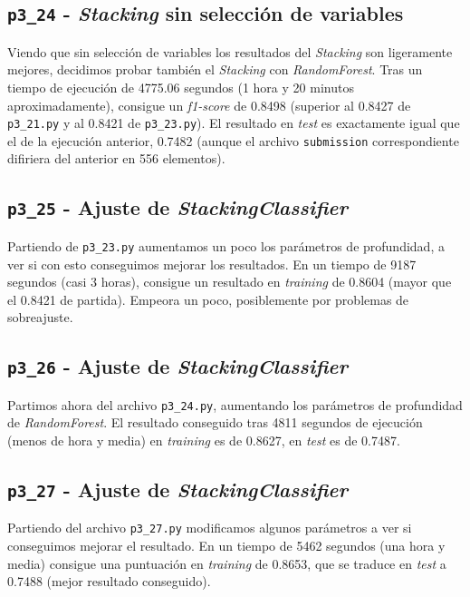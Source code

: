 \documentclass[a4paper, 20pt]{article}
\begin{document}
\subsection{\texttt{p3\_24} - \textit{Stacking} sin selección de variables}

Viendo que sin selección de variables los resultados del \textit{Stacking} son ligeramente mejores, decidimos probar también el \textit{Stacking} con \textit{RandomForest}. Tras un tiempo de ejecución de 4775.06 segundos (1 hora y 20 minutos aproximadamente), consigue un \textit{f1-score} de 0.8498 (superior al 0.8427 de \texttt{p3\_21.py} y al 0.8421 de \texttt{p3\_23.py}). El resultado en \textit{test} es exactamente igual que el de la ejecución anterior, 0.7482 (aunque el archivo \texttt{submission} correspondiente difiriera del anterior en 556 elementos).

\subsection{\texttt{p3\_25} - Ajuste de \textit{StackingClassifier}}
Partiendo de \texttt{p3\_23.py} aumentamos un poco los parámetros de profundidad, a ver si con esto conseguimos mejorar los resultados. En un tiempo de 9187 segundos (casi 3 horas), consigue un resultado en \textit{training} de 0.8604 (mayor que el 0.8421 de partida). Empeora un poco, posiblemente por problemas de sobreajuste.

\subsection{\texttt{p3\_26} - Ajuste de \textit{StackingClassifier}}

Partimos ahora del archivo \texttt{p3\_24.py}, aumentando los parámetros de profundidad de \textit{RandomForest}. El resultado conseguido tras 4811 segundos de ejecución (menos de hora y media) en \textit{training} es de 0.8627, en \textit{test} es de 0.7487.

\subsection{\texttt{p3\_27} - Ajuste de \textit{StackingClassifier}}

Partiendo del archivo \texttt{p3\_27.py} modificamos algunos parámetros a ver si conseguimos mejorar el resultado. En un tiempo de 5462 segundos (una hora y media) consigue una puntuación en \textit{training} de 0.8653, que se traduce en \textit{test} a 0.7488 (mejor resultado conseguido).
\end{document}
